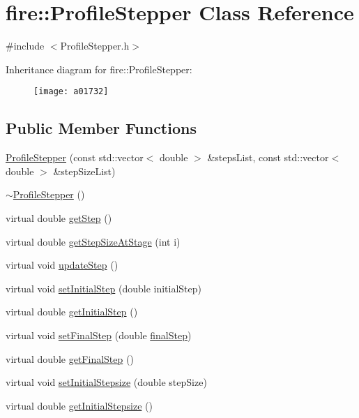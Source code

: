 \hypertarget{a01732}{}\section{fire\+:\+:Profile\+Stepper Class Reference}
\label{a01732}


{\ttfamily \#include $<$Profile\+Stepper.\+h$>$}

Inheritance diagram for fire\+:\+:Profile\+Stepper\+:\begin{figure}[H]
\begin{center}
\leavevmode
\texttt{[image: a01732]}
\end{center}
\end{figure}
\subsection*{Public Member Functions}
\begin{DoxyCompactItemize}
\item 
\hyperlink{a01732_a5bba5babbcb293b5e6a535cc4d06c55f}{Profile\+Stepper} (const std\+::vector$<$ double $>$ \&steps\+List, const std\+::vector$<$ double $>$ \&step\+Size\+List)
\item 
\hyperlink{a01732_a6838143d952dec2519a43c576a1f1546}{$\sim$\+Profile\+Stepper} ()
\item 
virtual double \hyperlink{a01732_a9096ad65a3fcf63678b600cbe0c33961}{get\+Step} ()
\item 
virtual double \hyperlink{a01732_adaa1a23c068977ecc6809dd8eecab49d}{get\+Step\+Size\+At\+Stage} (int i)
\item 
virtual void \hyperlink{a01732_a2c13fd4da5550f1e58df2b54bbfe4c2c}{update\+Step} ()
\item 
virtual void \hyperlink{a01732_adf2f78648d9539282225117c0fd243af}{set\+Initial\+Step} (double initial\+Step)
\item 
virtual double \hyperlink{a01732_af24660fa4bd027f877d5c1bdeb286cf5}{get\+Initial\+Step} ()
\item 
virtual void \hyperlink{a01732_af8203296b4f3bef53bafab7cb654cc97}{set\+Final\+Step} (double \hyperlink{a01732_a4f2347f039417fe9cdd16d3ca74a072d}{final\+Step})
\item 
virtual double \hyperlink{a01732_ae6f257aca7b3bb62a851169a01bcaacf}{get\+Final\+Step} ()
\item 
virtual void \hyperlink{a01732_a55c44fd97d8b6a474243ad0da48b039d}{set\+Initial\+Stepsize} (double step\+Size)
\item 
virtual double \hyperlink{a01732_a86e7035366907a08a36722655746271e}{get\+Initial\+Stepsize} ()
\end{DoxyCompactItemize}
